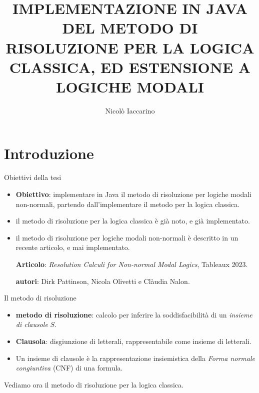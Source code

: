 \documentclass{beamer}
\title{IMPLEMENTAZIONE IN JAVA DEL METODO DI RISOLUZIONE PER LA LOGICA CLASSICA, ED ESTENSIONE A LOGICHE MODALI}
\author{Nicolò Iaccarino}
\begin{document}
\maketitle



\section{Introduzione}

\begin{frame}{Obiettivi della tesi}
    \begin{itemize}
        \item \textbf{Obiettivo}: implementare in Java il metodo di risoluzione per logiche modali non-normali, partendo dall'implementare il metodo per la logica classica.
        \vspace{10px}
        \item il metodo di risoluzione per la logica classica è già noto, e già implementato.
        \vspace{10px}
        \item il metodo di risoluzione per logiche modali non-normali è descritto in un recente articolo, e mai implementato.
        
        \vspace{10px}

        \textbf{Articolo}: \emph{Resolution Calculi for Non-normal Modal Logics}, Tableaux 2023.
        
        \textbf{autori}: Dirk Pattinson, Nicola Olivetti e Clàudia Nalon.
        \vspace{10px}
    \end{itemize}
    
    
\end{frame}

\begin{frame}{Il metodo di risoluzione}
    \begin{itemize}
        \item \textbf{metodo di risoluzione}: calcolo per inferire la soddisfacibilità di un \emph{insieme di clausole} $S$.
        \vspace{10px}
        \item \textbf{Clausola}: disgiunzione di letterali, rappresentabile come insieme di letterali.
        \vspace{10px}
        \item Un insieme di clausole è la rappresentazione insiemistica della \emph{Forma normale congiuntiva} (CNF) di una formula.
    \end{itemize}
    \vspace{20px}

    Vediamo ora il metodo di risoluzione per la logica classica.
\end{frame}
\end{document}
